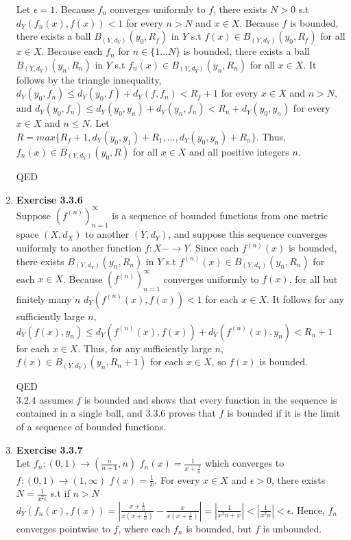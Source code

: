 \documentclass[10pt]{article}
\begin{document}
\begin{enumerate}[label=Problem \arabic*.]
   Let $\epsilon=1$. Because $f_n$ converges uniformly to $f$, there exists $N>0$ s.t $d_Y(f_n(x),f(x))<1$ for every $n>N$ and $x\in X$. 
   Because $f$ is bounded, there exists a ball $B_{(Y,d_Y)}(y_0,R_f)$ in $Y$ s.t $f(x)\in B_{(Y,d_Y)}(y_0,R_f)$ for all $x\in X$.
   Because each $f_n$ for $n\in\{1...N\}$ is bounded, there exists a ball $B_{(Y,d_Y)}(y_n,R_n)$ in $Y$ s.t $f_n(x)\in B_{(Y,d_Y)}(y_n,R_n)$ for all $x\in X$.
   It follows by the triangle innequality, $d_Y(y_0,f_n)\le d_Y(y_0,f)+d_Y(f,f_n)<R_f+1$ for every $x\in X$ and $n>N$, and $d_Y(y_0,f_n)\le d_Y(y_0,y_n)+d_Y(y_n,f_n)<R_n+d_Y(y_0,y_n)$ for every $x\in X$ and $n\le N$.
   Let $R=max\{R_f+1,d_Y(y_0,y_1)+R_1,...,d_Y(y_0,y_n)+R_n\}$.
   Thus, $f_n(x)\in B_{(Y,d_Y)}(y_0,R)$ for all $x\in X$ and all positive integers $n$.\par 
   QED
    \item \textbf{Exercise 3.3.6}\\
    Suppose $(f^{(n)})_{n=1}^{\infty}$ is a sequence of bounded functions from one metric space $(X,d_X)$ to another $(Y,d_Y)$, and suppose this sequence converges uniformly to another function $f:X-\rightarrow Y$.
    Since each $f^{(n)}(x)$ is bounded, there exists $B_{(Y,d_Y)}(y_n,R_n)$ in $Y$ s.t $f^{(n)}(x)\in B_{(Y,d_Y)}(y_n,R_n)$ for each $x\in X$.
    Because $(f^{(n)})_{n=1}^{\infty}$ converges uniformly to $f(x)$, for all but finitely many $n$ $d_Y(f^{(n)}(x),f(x))<1$ for each $x\in X$.
    It follows for any sufficiently large $n$, $d_Y(f(x),y_n)\le d_Y(f^{(n)}(x),f(x))+d_Y(f^{(n)}(x),y_n)<R_n+1$ for each $x\in X$.
    Thus, for any sufficiently large $n$, $f(x)\in B_{(Y,d_Y)}(y_n,R_n+1)$ for each $x\in X$, so $f(x)$ is bounded.\par 
    QED\\
    $3.2.4$ assumes $f$ is bounded and shows that every function in the sequence is contained in a single ball, and $3.3.6$ proves that $f$ is bounded if it is the limit of a sequence of bounded functions.
    \item \textbf{Exercise 3.3.7}\\
    Let $f_n:(0,1)\rightarrow (\frac{n}{n+1},n)$ $f_n(x)=\frac{1}{x+\frac{1}{n}}$ which converges to $f:(0,1)\rightarrow (1,\infty)$ $f(x)=\frac{1}{x}$.
    For every $x\in X$ and $\epsilon>0$, there exists $N=\frac{1}{x^2\epsilon}$ s.t if $n>N$ $d_Y(f_n(x),f(x))=|\frac{x+\frac{1}{n}}{x(x+\frac{1}{n})}-\frac{x}{x(x+\frac{1}{n})}|=|\frac{1}{x^2n+x}|<|\frac{1}{x^2n}|<\epsilon$.
    Hence, $f_n$ converges pointwise to $f$, where each $f_n$ is bounded, but $f$ is unbounded.\par 

\end{enumerate}
\end{document}
